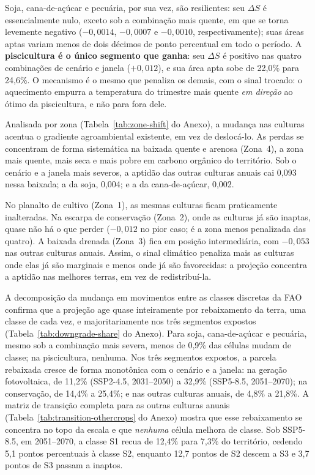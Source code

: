 Soja, cana-de-açúcar e pecuária, por sua vez, são resilientes: seu $\Delta S$ é essencialmente
nulo, exceto sob a combinação mais quente, em que se torna levemente negativo ($-0{,}0014$,
$-0{,}0007$ e $-0{,}0010$, respectivamente); suas áreas aptas variam menos de dois décimos de ponto
percentual em todo o período. A \textbf{piscicultura é o único segmento que ganha}: seu $\Delta S$ é
positivo nas quatro combinações de cenário e janela ($+0{,}012$), e sua área apta sobe de 22,0\% para
24,6\%. O mecanismo é o mesmo que penaliza os demais, com o sinal trocado: o aquecimento empurra a
temperatura do trimestre mais quente \emph{em direção} ao ótimo da piscicultura, e não para fora dele.

Analisada por zona (Tabela~\ref{tab:zone-shift} do Anexo), a mudança nas culturas acentua o gradiente
agroambiental existente, em vez de deslocá-lo. As perdas se concentram de forma sistemática na baixada
quente e arenosa (Zona~4), a zona mais quente, mais seca e mais pobre em carbono orgânico do
território. Sob o cenário e a janela mais severos, a aptidão das outras culturas anuais cai 0,093
nessa baixada; a da soja, 0,004; e a da cana-de-açúcar, 0,002.

No planalto de cultivo (Zona~1), as mesmas culturas ficam praticamente inalteradas. Na escarpa de
conservação (Zona~2), onde as culturas já são inaptas, quase não há o que perder ($-0{,}012$ no pior
caso; é a zona menos penalizada das quatro). A baixada drenada (Zona~3) fica em posição intermediária,
com $-0{,}053$ nas outras culturas anuais. Assim, o sinal climático penaliza mais as culturas onde elas
já são marginais e menos onde já são favorecidas: a projeção concentra a aptidão nas melhores terras,
em vez de redistribuí-la.

A decomposição da mudança em movimentos entre as classes discretas da FAO confirma que a projeção age
quase inteiramente por rebaixamento da terra, uma classe de cada vez, e majoritariamente nos três
segmentos expostos (Tabela~\ref{tab:downgrade-share} do Anexo). Para soja, cana-de-açúcar e pecuária,
mesmo sob a combinação mais severa, menos de 0,9\% das células mudam de classe; na piscicultura,
nenhuma. Nos três segmentos expostos, a parcela rebaixada cresce de forma monotônica com o cenário e a
janela: na geração fotovoltaica, de 11,2\% (SSP2-4.5, 2031--2050) a 32,9\% (SSP5-8.5, 2051--2070); na
conservação, de 14,4\% a 25,4\%; e nas outras culturas anuais, de 4,8\% a 21,8\%. A matriz de transição
completa para as outras culturas anuais (Tabela~\ref{tab:transition-othercrops} do Anexo) mostra que
esse rebaixamento se concentra no topo da escala e que \emph{nenhuma} célula melhora de classe. Sob
SSP5-8.5, em 2051--2070, a classe S1 recua de 12,4\% para 7,3\% do território, cedendo 5,1 pontos
percentuais à classe S2, enquanto 12,7 pontos de S2 descem a S3 e 3,7 pontos de S3 passam a inaptos.

